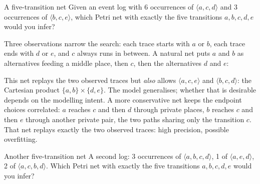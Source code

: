 \begin{examplebox}{A five-transition net}
Given an event log with 6 occurrences of $\langle a, c, d\rangle$ and 3 occurrences of $\langle b, c, e\rangle$, which Petri net with exactly the five transitions $a, b, c, d, e$ would you infer?
\end{examplebox}

Three observations narrow the search: each trace starts with $a$ or $b$, each trace ends with $d$ or $e$, and $c$ always runs in between. A natural net puts $a$ and $b$ as alternatives feeding a middle place, then $c$, then the alternatives $d$ and $e$:
\begin{center}
\end{center}
This net replays the two observed traces but \emph{also} allows $\langle a, c, e\rangle$ and $\langle b, c, d\rangle$: the Cartesian product $\{a, b\} \times \{d, e\}$. The model generalises; whether that is desirable depends on the modelling intent. A more conservative net keeps the endpoint choices correlated: $a$ reaches $c$ and then $d$ through private places, $b$ reaches $c$ and then $e$ through another private pair, the two paths sharing only the transition $c$. That net replays exactly the two observed traces: high precision, possible overfitting.

\begin{examplebox}{Another five-transition net}
A second log: 3 occurrences of $\langle a, b, c, d\rangle$, 1 of $\langle a, e, d\rangle$, 2 of $\langle a, c, b, d\rangle$. Which Petri net with exactly the five transitions $a, b, c, d, e$ would you infer?
\end{examplebox}

